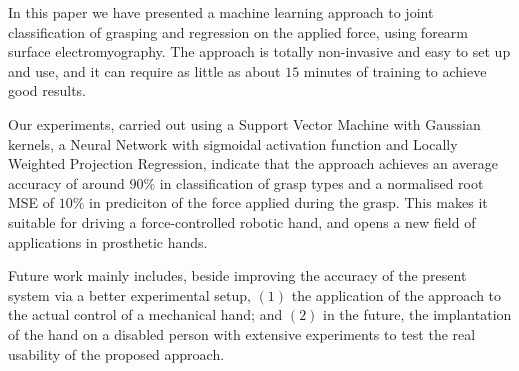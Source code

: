 In this paper we have presented a machine learning approach to
joint classification of grasping and regression on the applied force,
using forearm surface electromyography. The approach is totally
non-invasive and easy to set up and use, and it can require as little
as about $15$ minutes of training to achieve good results.

Our experiments, carried out using a Support Vector Machine with
Gaussian kernels, a Neural Network with sigmoidal activation
function and Locally Weighted Projection Regression, indicate that
the approach achieves an average accuracy of around $90\%$ in
classification of grasp types and a normalised root MSE of $10\%$
in prediciton of the force applied during the grasp. This makes it
suitable for driving a force-controlled robotic hand, and opens a
new field of applications in prosthetic hands.

Future work mainly includes, beside improving the accuracy of the present
system via a better experimental setup, $(1)$ the application of the
approach to the actual control of a mechanical hand; and $(2)$ in the
future, the implantation of the hand on a disabled person with
extensive experiments to test the real usability of the proposed
approach.
